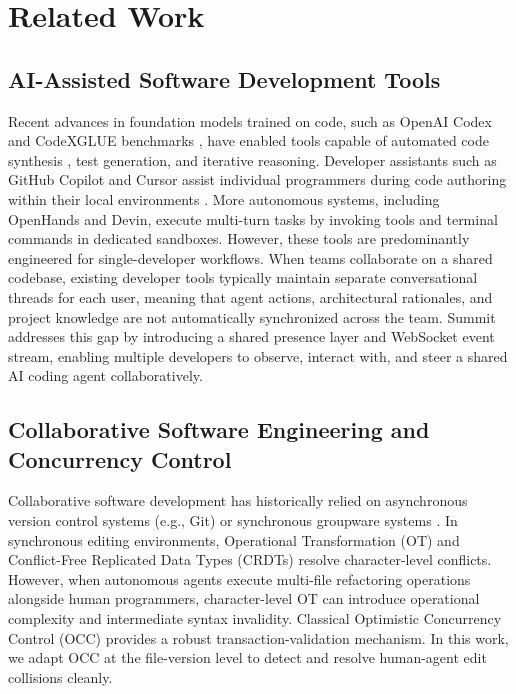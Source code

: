 \documentclass[conference]{IEEEtran}
\begin{document}
\section{Related Work}

\subsection{AI-Assisted Software Development Tools}
Recent advances in foundation models trained on code, such as OpenAI Codex \cite{chen2021evaluating} and CodeXGLUE benchmarks \cite{lu2021codexglue}, have enabled tools capable of automated code synthesis \cite{yin2020natural}, test generation, and iterative reasoning. Developer assistants such as GitHub Copilot and Cursor assist individual programmers during code authoring within their local environments \cite{ziegler2024measuring}. More autonomous systems, including OpenHands and Devin, execute multi-turn tasks by invoking tools and terminal commands in dedicated sandboxes. However, these tools are predominantly engineered for single-developer workflows. When teams collaborate on a shared codebase, existing developer tools typically maintain separate conversational threads for each user, meaning that agent actions, architectural rationales, and project knowledge are not automatically synchronized across the team. Summit addresses this gap by introducing a shared presence layer and WebSocket event stream, enabling multiple developers to observe, interact with, and steer a shared AI coding agent collaboratively.

\subsection{Collaborative Software Engineering and Concurrency Control}
Collaborative software development has historically relied on asynchronous version control systems (e.g., Git) or synchronous groupware systems \cite{storey2017social}. In synchronous editing environments, Operational Transformation (OT) and Conflict-Free Replicated Data Types (CRDTs) \cite{ellis1989concurrency} resolve character-level conflicts. However, when autonomous agents execute multi-file refactoring operations alongside human programmers, character-level OT can introduce operational complexity and intermediate syntax invalidity. Classical Optimistic Concurrency Control (OCC) \cite{kung1981optimistic} provides a robust transaction-validation mechanism. In this work, we adapt OCC at the file-version level to detect and resolve human-agent edit collisions cleanly.
\end{document}
